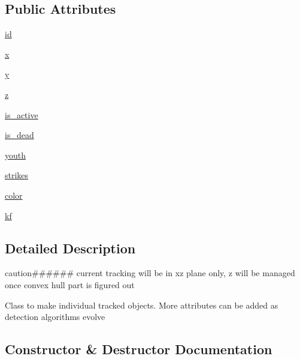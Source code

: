\subsection*{Public Attributes}
\begin{DoxyCompactItemize}
\item 
\hyperlink{classmot_1_1tracked__object_a2e1c170f5477636531ae08ae12d0b17f}{id}
\item 
\hyperlink{classmot_1_1tracked__object_ac78ee1daddcff29c0edbef88e4370ffa}{x}
\item 
\hyperlink{classmot_1_1tracked__object_abd3e436fb18ba75bbdcef0142ffc5dee}{y}
\item 
\hyperlink{classmot_1_1tracked__object_a557c82a367e7932c8ee09d6173ef8a4c}{z}
\item 
\hyperlink{classmot_1_1tracked__object_a35a31c9e6f822eae9ff5ca5f72678687}{is\+\_\+active}
\item 
\hyperlink{classmot_1_1tracked__object_a67774c920ad68d87e2ec5c9c24c6fc41}{is\+\_\+dead}
\item 
\hyperlink{classmot_1_1tracked__object_a28e39b4317941f7dbd7d5c9b1586a414}{youth}
\item 
\hyperlink{classmot_1_1tracked__object_a83c8c4e2de30738f82b230237ae7ef78}{strikes}
\item 
\hyperlink{classmot_1_1tracked__object_a0f664cb6dc1c47a03245a3db2d6a3d20}{color}
\item 
\hyperlink{classmot_1_1tracked__object_a9fbaab65f9687617dbda8a32f11f729e}{kf}
\end{DoxyCompactItemize}


\subsection{Detailed Description}
caution\#\#\#\#\#\# current tracking will be in xz plane only, z will be managed once convex hull part is figured out 

\begin{DoxyVerb}Class to make individual tracked objects. More attributes can be added as detection algorithms evolve \end{DoxyVerb}
 

\subsection{Constructor \& Destructor Documentation}
\mbox{\label{classmot_1_1tracked__object_a15a1a975124c8c8a87232063ea9c8f37}} 
